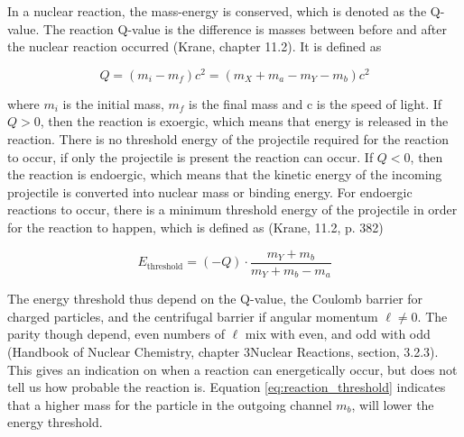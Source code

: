 \documentclass[a4paper,11pt,twoside]{book}
\begin{document}

\noindent In a nuclear reaction, the mass-energy is conserved, which is denoted as the Q-value. The reaction Q-value is the difference is masses between before and after the nuclear reaction occurred (Krane, chapter 11.2). It is defined as 

\begin{equation}
    Q = (m_i - m_f)c^2 = (m_X + m_a - m_Y - m_b)c^2
\end{equation}

\noindent where $m_i$ is the initial mass, $m_f$ is the final mass and c is the speed of light. If $Q>0$, then the reaction is exoergic, which means that energy is released in the reaction. There is no threshold energy of the projectile required for the reaction to occur, if only the projectile is present the reaction can occur. If $Q<0$, then the reaction is endoergic, which means that the kinetic energy of the incoming projectile is converted into nuclear mass or binding energy. For endoergic reactions to occur, there is a minimum threshold energy of the projectile in order for the reaction to happen, which is defined as (Krane, 11.2, p. 382)

\begin{equation} \label{eq:reaction_threshold}
    E_\text{threshold} = (-Q) \cdot \frac{m_Y +m_b}{m_Y + m_b -m_a}
\end{equation}


\noindent The energy threshold thus depend on the Q-value, the Coulomb barrier for charged particles, and the centrifugal barrier if angular momentum $\ell\neq 0$. The parity though depend, even numbers of $\ell$ mix with even, and odd with odd (Handbook of Nuclear Chemistry, chapter 3Nuclear Reactions, section, 3.2.3). This gives an indication on when a reaction can energetically occur, but does not tell us how probable the reaction is. Equation \ref{eq:reaction_threshold} indicates that a higher mass for the particle in the outgoing channel $m_b$, will lower the energy threshold.\\ 
\end{document}
